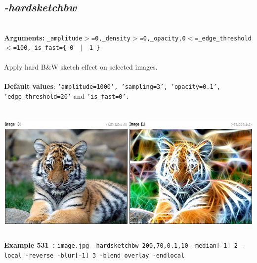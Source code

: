 \documentclass[a4paper,11pt,twoside]{book}
\begin{document}
\subsection{\emph{-hardsketchbw} }\vspace*{-0.5em}
~\\\textbf{Arguments: } 
{\small \texttt{\_amplitude$>$=0,\_density$>$=0,\_opacity,0$<$=\_edge\_threshold$<$=100,\_is\_fast=\{ 0 ~$|$~ 1 \}}}\\~\\
Apply hard B\&W sketch effect on selected images.
~\\~\\\textbf{Default values}: {\small \texttt{'amplitude=1000', 'sampling=3', 'opacity=0.1', 'edge\_threshold=20'} and \texttt{'is\_fast=0'.}}
\begin{center}\includegraphics[keepaspectratio=true,height=7cm,width=\textwidth]{img/gmic_def531.jpg}\\
{\footnotesize \textbf{Example 531~:} \texttt{image.jpg --hardsketchbw 200,70,0.1,10 -median[-1] 2 --local -reverse -blur[-1] 3 -blend overlay -endlocal}}
\end{center}
\end{document}
